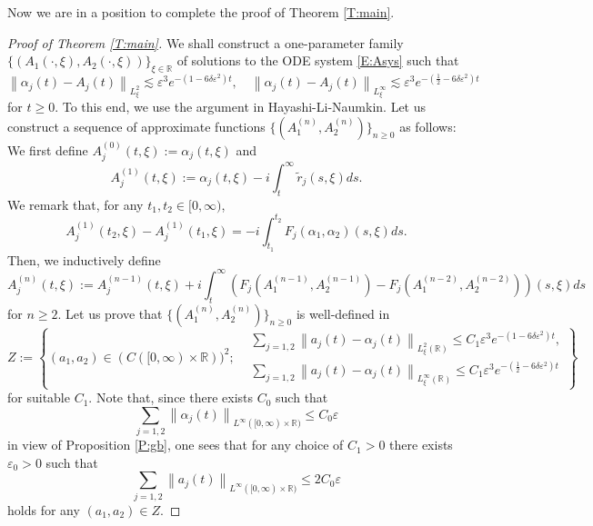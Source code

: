 \documentclass[11pt,a4paper,oneside]{amsart}
\theoremstyle{plain}
\theoremstyle{remark}
\numberwithin{equation}{section}
\newcommand{\R}{\mathbb{R}}
\newcommand{\norm}[1]{\left\lVert #1\right\rVert}
\def\({\left(}
\def\){\right)}
\def\le{\leqslant}
\def\ge{\geqslant}
\newcommand{\eps}{\varepsilon}
\theoremstyle{definition}
\begin{document}
Now we are in a position to complete the proof of Theorem \ref{T:main}.

\begin{proof}[Proof of Theorem \ref{T:main}]
We shall construct a one-parameter family $\{ (A_1(\cdot,\xi),A_2(\cdot,\xi)) \}_{\xi \in \R}$
of 
solutions to the ODE system \eqref{E:Asys} such that
\[
	\norm{\alpha_j(t) - A_j(t)}_{L^2_\xi} \lesssim \eps^3 e^{-(1-6\delta \eps^2 )t}, \quad
	\norm{\alpha_j(t) - A_j(t)}_{L^\infty_\xi} \lesssim \eps^3 e^{-(\frac12-6\delta \eps^2 )t}
\]
for $t\ge0$.
To this end, we use the argument in Hayashi-Li-Naumkin.
%
Let us construct a sequence of approximate functions $\{ (A_1^{(n)},A_2^{(n)}) \}_{n\ge0}$ as follows:
We first define $A_j^{(0)}(t,\xi) := \alpha_j(t,\xi)$ and
\[
	A_j^{(1)}(t,\xi) := \alpha_j(t,\xi) -i \int_t^\infty \widetilde{r}_j(s,\xi)ds.
\]	
We remark that, for any $t_1,t_2 \in [0,\infty)$,
\begin{equation}\label{E:appf0}
	A_j^{(1)}(t_2,\xi) - A_j^{(1)}(t_1,\xi)
	=  -i \int_{t_1}^{t_2} F_j(\alpha_1,\alpha_2)(s,\xi)ds.
\end{equation}
Then, we inductively define
\[
	A_j^{(n)}(t,\xi) := A_j^{(n-1)}(t,\xi)
	+i \int_t^\infty \(F_j(A_1^{(n-1)},A_2^{(n-1)})-F_j(A_1^{(n-2)},A_2^{(n-2)})\)(s,\xi)ds
\]
for $n\ge2$.
Let us prove that $\{ (A_1^{(n)},A_2^{(n)}) \}_{n\ge0}$ is well-defined in 
\[
	Z:=\left\{  (a_1,a_2) \in ( C([0,\infty)\times \R) )^2 ; 
	\begin{aligned}
	&\sum_{j=1,2} \norm{a_j(t)-\alpha_j(t)}_{L^2_\xi (\R)} \le C_1 \eps^3 e^{-(1-6\delta \eps^2 )t},\\
	&\sum_{j=1,2} \norm{a_j(t)-\alpha_j(t)}_{L^\infty_\xi (\R)} \le C_1 \eps^3 e^{-(\frac12-6\delta \eps^2 )t}
	\end{aligned}
	\right\}
\]
for suitable $C_1$.
Note that, since there exists $C_0$ such that
\[
	\sum_{j=1,2} \norm{\alpha_j(t)}_{L^\infty ([0,\infty)\times \R)} \le C_0 \eps
\]
in view of Proposition \ref{P:gb}, one sees that
for any choice of $C_1>0$ there exists $\eps_0 >0$
such that
\[
	\sum_{j=1,2} \norm{a_j(t)}_{L^\infty ([0,\infty)\times \R)} \le 2C_0 \eps
\]
holds
for any $(a_1,a_2) \in Z$.


\end{proof}
\end{document}
